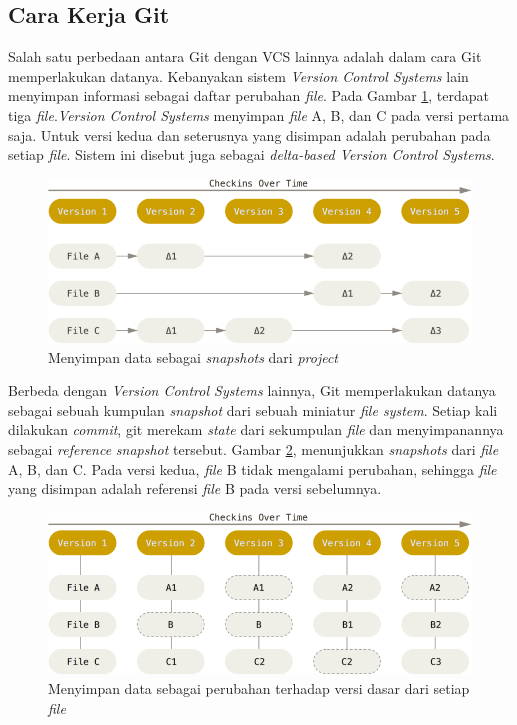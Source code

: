 \subsection{Cara Kerja Git}
\label{subsec:cara_kerja_git}
Salah satu perbedaan antara Git dengan VCS lainnya adalah dalam cara Git memperlakukan datanya\cite{chacon2014pro}. Kebanyakan sistem \textit{Version Control Systems} lain menyimpan informasi sebagai daftar perubahan \textit{file}. Pada Gambar \ref{fig:deltas}, terdapat tiga \textit{file}.\textit{Version Control Systems} menyimpan \textit{file} A, B, dan C pada versi pertama saja. Untuk versi kedua dan seterusnya yang disimpan adalah perubahan pada setiap \textit{file}. Sistem ini disebut juga sebagai \textit{delta-based Version Control Systems}. 
\begin{figure}[H]
	\centering
		\includegraphics[scale=0.5]{Gambar/deltas.png}
	\caption{Menyimpan data sebagai \textit{snapshots} dari \textit{project}}
	\label{fig:deltas}
\end{figure}


Berbeda dengan \textit{Version Control Systems} lainnya, Git memperlakukan datanya sebagai sebuah kumpulan \textit{snapshot} dari sebuah miniatur \textit{file system}\cite{chacon2014pro}. Setiap kali dilakukan \textit{commit}, git merekam \textit{state} dari sekumpulan \textit{file} dan menyimpanannya sebagai \textit{reference} \textit{snapshot} tersebut. Gambar \ref{fig:snapshots}, menunjukkan \textit{snapshots} dari \textit{file} A, B, dan C. Pada versi kedua, \textit{file} B tidak mengalami perubahan, sehingga \textit{file} yang disimpan adalah referensi \textit{file} B pada versi sebelumnya.
\begin{figure}[H]
	\centering
		\includegraphics[scale=0.5]{Gambar/snapshots.png}
	\caption{Menyimpan data sebagai perubahan terhadap versi dasar dari setiap \textit{file}}
	\label{fig:snapshots}
\end{figure}


